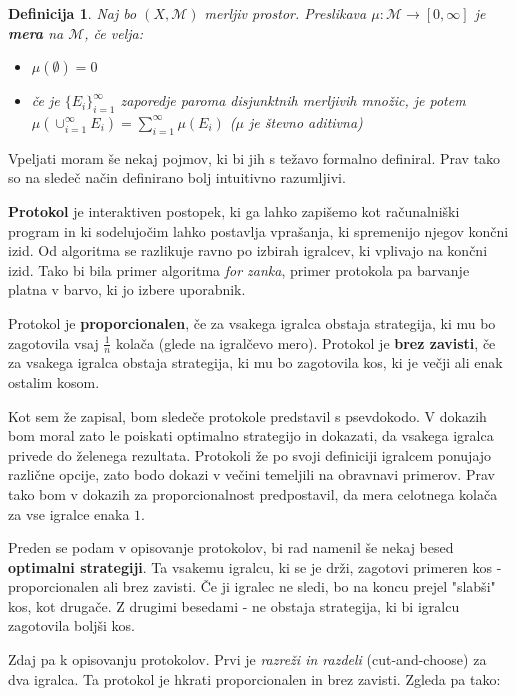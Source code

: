 \documentclass[a4paper, 12pt]{article}
\newtheorem{definicija}{Definicija}
\begin{document}
	\begin{definicija}
		Naj bo $(X, \mathcal{M})$ merljiv prostor. Preslikava $\mu : \mathcal{M} \to [0, \infty]$ je \textbf{mera} na $\mathcal{M}$, če velja:
		\begin{itemize}
			\item $\mu(\emptyset) = 0$
			\item če je $\{E_i\}_{i=1}^{\infty}$ zaporedje paroma disjunktnih merljivih množic, je potem $\mu(\cup_{i=1}^{\infty}E_i) = \sum_{i=1}^{\infty} \mu(E_i)$ ($\mu$ je števno aditivna)
		\end{itemize}		
	\end{definicija}

	Vpeljati moram še nekaj pojmov, ki bi jih s težavo formalno definiral. Prav tako so na sledeč način definirano bolj intuitivno razumljivi.
	
	\textbf{Protokol} je interaktiven postopek, ki ga lahko zapišemo kot računalniški program in ki sodelujočim lahko postavlja vprašanja, ki spremenijo njegov končni izid. Od algoritma se razlikuje ravno po izbirah igralcev, ki vplivajo na končni izid. Tako bi bila primer algoritma \textit{for zanka}, primer protokola pa barvanje platna v barvo, ki jo izbere uporabnik.
	
	Protokol je \textbf{proporcionalen}, če za vsakega igralca obstaja strategija, ki mu bo zagotovila vsaj $\frac{1}{n}$ kolača (glede na igralčevo mero). Protokol je \textbf{brez zavisti}, če za vsakega igralca obstaja strategija, ki mu bo zagotovila kos, ki je večji ali enak ostalim kosom. 
	
	Kot sem že zapisal, bom sledeče protokole predstavil s psevdokodo. V dokazih bom moral zato le poiskati optimalno strategijo in dokazati, da vsakega igralca privede do želenega rezultata. Protokoli že po svoji definiciji igralcem ponujajo različne opcije, zato bodo dokazi v večini temeljili na obravnavi primerov. Prav tako bom v dokazih za proporcionalnost predpostavil, da mera celotnega kolača za vse igralce enaka $1$. 
	
	Preden se podam v opisovanje protokolov, bi rad namenil še nekaj besed \textbf{optimalni strategiji}. Ta vsakemu igralcu, ki se je drži, zagotovi primeren kos - proporcionalen ali brez zavisti. Če ji igralec ne sledi, bo na koncu prejel "slabši" kos, kot drugače. Z drugimi besedami - ne obstaja strategija, ki bi igralcu zagotovila boljši kos. 
	
	Zdaj pa k opisovanju protokolov. Prvi je \textit{razreži in razdeli} (cut-and-choose) za dva igralca. Ta protokol je hkrati proporcionalen in brez zavisti. Zgleda pa tako:
	
\end{document}
